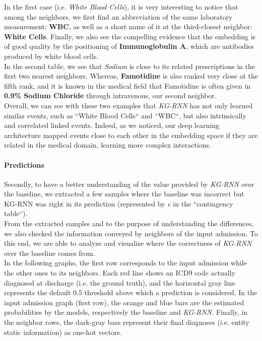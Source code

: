 In the first case (i.e. \textit{White Blood Cells}), it is very interesting to notice that among the neighbors, we first find an abbreviation of the same laboratory measurement: \textbf{WBC}, as well as a short name of it at the third-closest neighbor: \textbf{White Cells}. Finally, we also see the compelling evidence that the embedding is of good quality by the positioning of \textbf{Immunoglobulin A}, which are antibodies produced by white blood cells. \\

In the second table, we see that \textit{Sodium} is close to its related prescriptions in the first two nearest neighbors. Whereas, \textbf{Famotidine} is also ranked very close at the fifth rank, and it is known in the medical field that Famotidine is often given in \textbf{0.9\% Sodium Chloride} through intravenous, our second neighbor. \\

Overall, we can see with these two examples that \emph{KG-RNN} has not only learned similar events, such as ``White Blood Cells`` and ``WBC``, but also intrinsically and correlated linked events. Indeed, as we noticed, our deep learning architecture mapped events close to each other in the embedding space if they are related in the medical domain, learning more complex interactions.

\newpage
\paragraph{Predictions} Secondly, to have a better understanding of the value provided by \emph{KG-RNN} over the baseline, we extracted a few samples where the baseline was incorrect but KG-RNN was right in its prediction (represented by \textit{c} in the ``contingency table``). \\

From the extracted samples and to the purpose of understanding the differences, we also checked the information conveyed by neighbors of the input admission. To this end, we are able to analyze and visualize where the correctness of \emph{KG-RNN} over the baseline comes from. \\

In the following graphs, the first row corresponds to the input admission while the other ones to its neighbors. Each red line shows an ICD9 code actually diagnosed at discharge (i.e. the ground truth), and the horizontal gray line represents the default 0.5 threshold above which a prediction is considered.  In the input admission graph (first row), the orange and blue bars are the estimated probabilities by the models, respectively the baseline and \emph{KG-RNN}. Finally, in the neighbor rows, the dark-gray bars represent their final diagnoses (i.e. entity static information) as one-hot vectors. \\

